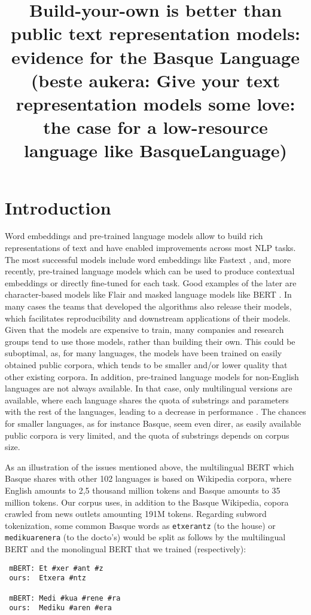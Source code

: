 \documentclass[10pt, a4paper]{article}
\title{Build-your-own is better than public text representation models: \\ evidence for the Basque Language\\ (beste aukera: Give your text representation models some love: the case for a low-resource language like BasqueLanguage)}
\begin{document}
\maketitleabstract

\section{Introduction}\label{sec:introduction}

Word embeddings and pre-trained language models allow to build rich representations of text and have enabled improvements across most NLP tasks. The most successful models include word embeddings like Fastext \cite{fasttext1_bojanowski2017enriching}, and, more recently, pre-trained language models which can be used to produce contextual embeddings or directly fine-tuned for each task. Good examples of the later are character-based models like Flair \cite{akbik2018coling} and masked language models like BERT \cite{devlin2019bert}. In many cases the teams that developed the algorithms also release their models, which facilitates reproducibility and downstream applications of their models. Given that the models are expensive to train, many companies and research groups tend to use those models, rather than building their own. This could be suboptimal, as, for many languages, the models have been trained on easily obtained public corpora, which tends to be smaller and/or lower quality that other existing corpora. In addition, pre-trained language models for non-English languages are not always available. In that case, only multilingual versions are available, where each language shares the quota of substrings and parameters with the rest of the languages, leading to a decrease in performance \cite{devlin2019bert}.  The chances for smaller languages, as for instance Basque, seem even direr, as easily available public corpora is very limited, and the quota of substrings depends on corpus size. 

As an illustration of the issues mentioned above, the multilingual BERT which Basque shares with other 102 languages is based on Wikipedia corpora, where English amounts to 2,5 thousand million tokens and Basque amounts to 35 million tokens. Our corpus uses, in addition to the Basque Wikipedia, copora crawled from news outlets amounting 191M tokens. Regarding subword tokenization, some common Basque words as \texttt{etxerantz} (to the house) or \texttt{medikuarenera} (to the docto's) would be split as follows by the multilingual BERT and the monolingual BERT that we trained (respectively):

\begin{verbatim}
 mBERT: Et #xer #ant #z
 ours:  Etxera #ntz

 mBERT: Medi #kua #rene #ra   
 ours:  Mediku #aren #era     
\end{verbatim}
\end{document}
